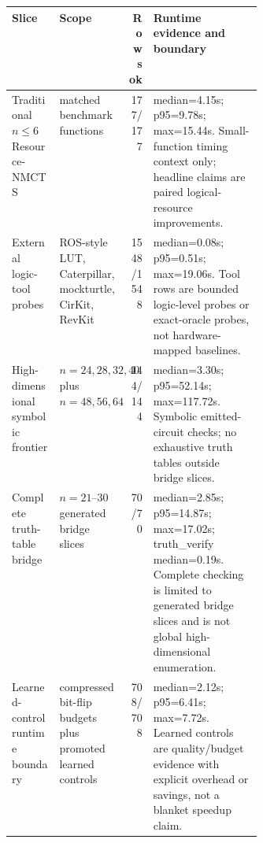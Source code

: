 \begin{tabularx}{\linewidth}{>{\raggedright\arraybackslash}p{0.19\linewidth}>{\raggedright\arraybackslash}p{0.18\linewidth}r>{\raggedright\arraybackslash}X}
\toprule
Slice & Scope & Rows ok & Runtime evidence and boundary \\
\midrule
Traditional $n\leq6$ Resource-NMCTS & 177 matched benchmark functions & 177/177 & median=4.15s; p95=9.78s; max=15.44s. Small-function timing context only; headline claims are paired logical-resource improvements. \\
External logic-tool probes & ROS-style LUT, Caterpillar, mockturtle, CirKit, RevKit & 1548/1548 & median=0.08s; p95=0.51s; max=19.06s. Tool rows are bounded logic-level probes or exact-oracle probes, not hardware-mapped baselines. \\
High-dimensional symbolic frontier & $n=24,28,32,40$ plus $n=48,56,64$ & 144/144 & median=3.30s; p95=52.14s; max=117.72s. Symbolic emitted-circuit checks; no exhaustive truth tables outside bridge slices. \\
Complete truth-table bridge & $n=21$--$30$ generated bridge slices & 70/70 & median=2.85s; p95=14.87s; max=17.02s; truth\_verify median=0.19s. Complete checking is limited to generated bridge slices and is not global high-dimensional enumeration. \\
Learned-control runtime boundary & compressed bit-flip budgets plus promoted learned controls & 708/708 & median=2.12s; p95=6.41s; max=7.72s. Learned controls are quality/budget evidence with explicit overhead or savings, not a blanket speedup claim. \\
\bottomrule
\end{tabularx}
